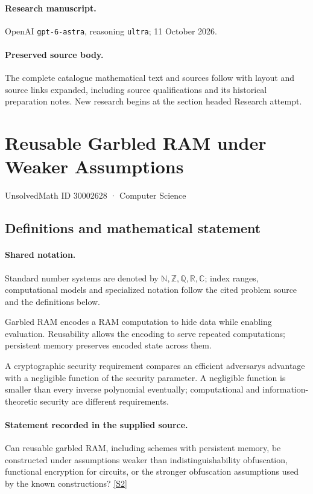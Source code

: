 \documentclass[11pt]{article}
\begin{document}
\paragraph{Research manuscript.} OpenAI \texttt{gpt-6-astra}, reasoning \texttt{ultra}; 11 October 2026.
\paragraph{Preserved source body.} The complete catalogue mathematical text and sources follow with layout and source links expanded, including source qualifications and its historical preparation notes. New research begins at the section headed Research attempt.

\section{Reusable Garbled RAM under Weaker Assumptions}\label{30002628}
{\small UnsolvedMath ID 30002628 · Computer Science}
\subsection{Definitions and mathematical statement}

\paragraph{Shared notation.}Standard number systems are denoted by $\mathbb N,\mathbb Z,\mathbb Q,\mathbb R,\mathbb C$; index ranges, computational models and specialized notation follow the cited problem source and the definitions below.


Garbled RAM encodes a RAM computation to hide data while enabling evaluation. Reusability allows the encoding to serve repeated computations; persistent memory preserves encoded state across them.

A cryptographic security requirement compares an efficient adversary\textquotesingle s advantage with a negligible function of the security parameter. A negligible function is smaller than every inverse polynomial eventually; computational and information-theoretic security are different requirements.
\paragraph{Statement recorded in the supplied source.}
Can reusable garbled RAM, including schemes with persistent memory, be constructed under assumptions weaker than indistinguishability obfuscation, functional encryption for circuits, or the stronger obfuscation assumptions used by the known constructions? \href{https://doi.org/10.4171/owr/2014/35}{[S2]}
\end{document}
